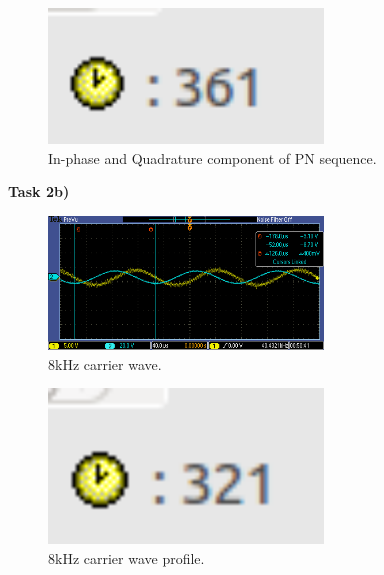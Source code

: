 \documentclass{article}
\begin{document}
\begin{figure}[h]
  \begin{center}
    \includegraphics[width=0.65\textwidth]{img/task_e_profile.png}
    \caption{In-phase and Quadrature component of PN sequence.}
  \end{center}
\end{figure}

\pagebreak

\pagebreak
\textbf{Task 2b)}

\begin{figure}[h]
  \begin{center}
    \includegraphics[width=0.65\textwidth]{img/task_2_b_oscilloscope.png}
    \caption{8kHz carrier wave.}
  \end{center}
\end{figure}

\begin{figure}[h]
  \begin{center}
    \includegraphics[width=0.65\textwidth]{img/task_2_b_profile.png}
    \caption{8kHz carrier wave profile.}
  \end{center}
\end{figure}
\end{document}
